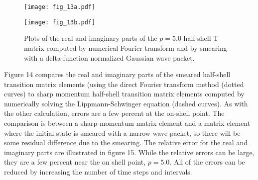 \documentclass[aps,prc,reprint,noshowpacs,groupedaddress,onecolumn]{revtex4}
\begin{document}
\begin{figure}
\caption{Plots of the real and imaginary parts of the $p=5.0$ half-shell T matrix computed by numerical Fourier transform and
by smearing with a delta-function normalized Gaussian wave packet.
}
\begin{minipage}[t]{.45\linewidth}
\centering
\texttt{[image: fig\_13a.pdf]}
\end{minipage}
\begin{minipage}[t]{.45\linewidth}
\centering
\texttt{[image: fig\_13b.pdf]}
\end{minipage}
\label{figure 13}
\end{figure}  

Figure 14 compares the real and imaginary parts of the smeared
half-shell transition matrix elements (using the direct Fourier
transform method (dotted curves) to sharp momentum half-shell
transition matrix elements computed by numerically solving the
Lippmann-Schwinger equation (dashed curves).
As with the other calculation, errors
are a few percent at the on-shell point.  The comparison is between a
sharp-momentum matrix element and a matrix element where the initial
state is smeared with a narrow wave packet, so there will be some
residual difference due to the smearing.  The relative error
for the real and imaginary parts are illustrated in figure 15.
While the relative errors can be large, they are a few percent near the
on shell point, $p=5.0$.  All of the errors can
be reduced by increasing the number of time steps and intervals.
 
\end{document}
